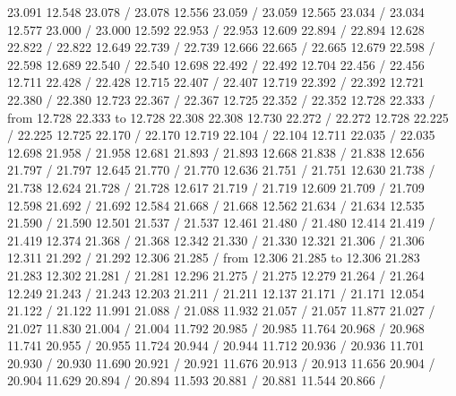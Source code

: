 {{ 23.091 12.548 23.078 /
 23.078 12.556 23.059 /
 23.059 12.565 23.034 /
 23.034 12.577 23.000 /
 23.000 12.592 22.953 /
 22.953 12.609 22.894 /
 22.894 12.628 22.822 /
 22.822 12.649 22.739 /
 22.739 12.666 22.665 /
 22.665 12.679 22.598 /
 22.598 12.689 22.540 /
 22.540 12.698 22.492 /
 22.492 12.704 22.456 /
 22.456 12.711 22.428 /
 22.428 12.715 22.407 /
 22.407 12.719 22.392 /
 22.392 12.721 22.380 /
 22.380 12.723 22.367 /
 22.367 12.725 22.352 /
 22.352 12.728 22.333 /
\putrule from 12.728 22.333 to 12.728 22.308
 22.308 12.730 22.272 /
 22.272 12.728 22.225 /
 22.225 12.725 22.170 /
 22.170 12.719 22.104 /
 22.104 12.711 22.035 /
 22.035 12.698 21.958 /
 21.958 12.681 21.893 /
 21.893 12.668 21.838 /
 21.838 12.656 21.797 /
 21.797 12.645 21.770 /
 21.770 12.636 21.751 /
 21.751 12.630 21.738 /
 21.738 12.624 21.728 /
 21.728 12.617 21.719 /
 21.719 12.609 21.709 /
 21.709 12.598 21.692 /
 21.692 12.584 21.668 /
 21.668 12.562 21.634 /
 21.634 12.535 21.590 /
 21.590 12.501 21.537 /
 21.537 12.461 21.480 /
 21.480 12.414 21.419 /
 21.419 12.374 21.368 /
 21.368 12.342 21.330 /
 21.330 12.321 21.306 /
 21.306 12.311 21.292 /
 21.292 12.306 21.285 /
\putrule from 12.306 21.285 to 12.306 21.283
 21.283 12.302 21.281 /
 21.281 12.296 21.275 /
 21.275 12.279 21.264 /
 21.264 12.249 21.243 /
 21.243 12.203 21.211 /
 21.211 12.137 21.171 /
 21.171 12.054 21.122 /
 21.122 11.991 21.088 /
 21.088 11.932 21.057 /
 21.057 11.877 21.027 /
 21.027 11.830 21.004 /
 21.004 11.792 20.985 /
 20.985 11.764 20.968 /
 20.968 11.741 20.955 /
 20.955 11.724 20.944 /
 20.944 11.712 20.936 /
 20.936 11.701 20.930 /
 20.930 11.690 20.921 /
 20.921 11.676 20.913 /
 20.913 11.656 20.904 /
 20.904 11.629 20.894 /
 20.894 11.593 20.881 /
 20.881 11.544 20.866 /
}}
